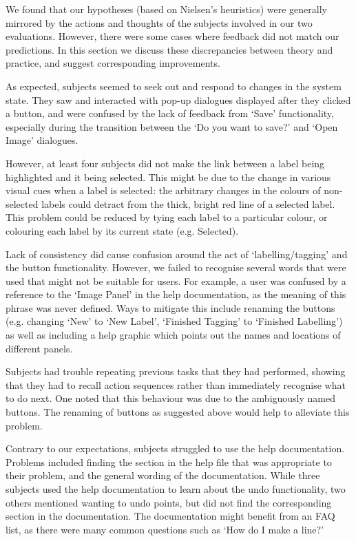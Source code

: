 \documentclass[11pt,twocolumn]{article}
\begin{document}
We found that our hypotheses (based on Nielsen's heuristics) were generally
mirrored by the actions and thoughts of the subjects involved in our two
evaluations. However, there were some cases where feedback did not match our
predictions. In this section we discuss these discrepancies between theory and
practice, and suggest corresponding improvements.

As expected, subjects seemed to seek out and respond to changes in the system
state. They saw and interacted with pop-up dialogues displayed after they
clicked a button, and were confused by the lack of feedback from `Save'
functionality, especially during the transition between the `Do you want to
save?' and `Open Image' dialogues. 

However, at least four subjects did not make the link between a label being
highlighted and it being selected. This might be due to the change in various
visual cues when a label is selected: the arbitrary changes in the colours of
non-selected labels could detract from the thick, bright red line of a selected
label. This problem could be reduced by tying each label to a particular
colour, or colouring each label by its current state (e.g. Selected).

Lack of consistency did cause confusion around the act of `labelling/tagging'
and the button functionality. However, we failed to recognise several words
that were used that might not be suitable for users. For example, a user was
confused by a reference to the `Image Panel' in the help documentation, as the
meaning of this phrase was never defined. Ways to mitigate this include
renaming the buttons (e.g. changing `New' to `New Label', `Finished Tagging' to
`Finished Labelling') as well as including a help graphic which points out the
names and locations of different panels.

Subjects had trouble repeating previous tasks that they had performed, showing
that they had to recall action sequences rather than immediately recognise
what to do next. One noted that this behaviour was due to the ambiguously named
buttons. The renaming of buttons as suggested above would help to alleviate
this problem. 
 
Contrary to our expectations, subjects struggled to use the help documentation.
Problems included finding the section in the help file that was appropriate to
their problem, and the general wording of the documentation. While three
subjects used the help documentation to learn about the undo functionality, two
others mentioned wanting to undo points, but did not find the corresponding
section in the documentation. The documentation might benefit from an FAQ list,
as there were many common questions such as `How do I make a line?'
\end{document}
